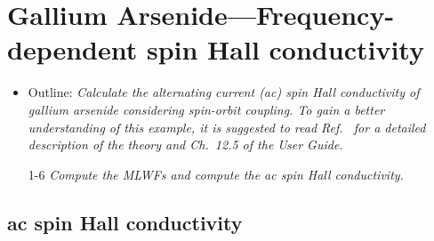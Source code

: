 \section{Gallium Arsenide---Frequency-dependent spin Hall conductivity}
\label{sec30:GaAsSHC}

\begin{itemize}
	\item Outline: {\it Calculate the alternating current (ac) spin Hall conductivity
	of gallium arsenide considering spin-orbit coupling.
	To gain a better understanding of this example,
	it is suggested to read Ref.~ for a detailed
	description of the theory and Ch.~12.5 of the User Guide.}
\end{itemize}

\begin{itemize}
	\item[1-6] {\it Compute the MLWFs and compute the ac spin Hall conductivity.}
\end{itemize}

\subsection*{ac spin Hall conductivity}

